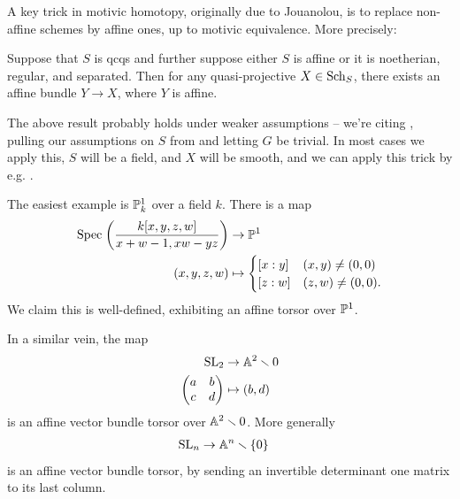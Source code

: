 \documentclass[11pt,openany]{book}
\begin{document}
A key trick in motivic homotopy, originally due to Jouanolou, is to replace non-affine schemes by affine ones, up to motivic equivalence. More precisely:

\begin{theorem}Suppose that $S$ is qcqs and further suppose either $S$ is affine or it is noetherian, regular, and separated. Then for any quasi-projective $X\in \Sch_S$, there exists an affine bundle $Y \to X$, where $Y$ is affine.
\end{theorem}

\begin{remark} The above result probably holds under weaker assumptions -- we're citing \cite[2.20]{Hoyois6}, pulling our assumptions on $S$ from \cite[2.8]{Hoyois6} and letting $G$ be trivial. In most cases we apply this, $S$ will be a field, and $X$ will be smooth, and we can apply this trick by e.g. \cite[3.3.3]{AF-spheres}.
\end{remark}


\begin{example} The easiest example is $\P^1_k$ over a field $k$. There is a map
\begin{align*}
    \Spec \left( \frac{k[x,y,z,w]}{x+w-1,xw-yz} \right) &\to \P^1 \\
    (x,y,z,w) &\mapsto \begin{cases} [x:y] & (x,y)\ne (0,0) \\ [z:w] & (z,w)\ne (0,0). \end{cases}
\end{align*}
We claim this is well-defined, exhibiting an affine torsor over $\P^1$.
\end{example}

\begin{example} In a similar vein, the map
\begin{align*}
    \SL_2 &\to \A^2\minus 0 \\
    \begin{pmatrix} a & b \\ c & d \end{pmatrix} &\mapsto (b,d)
\end{align*}
is an affine vector bundle torsor over $\A^2\minus 0$. More generally
\begin{align*}
    \SL_n &\to \A^n\minus\{0\}
\end{align*}
is an affine vector bundle torsor, by sending an invertible determinant one matrix to its last column.
\end{example}
\end{document}
